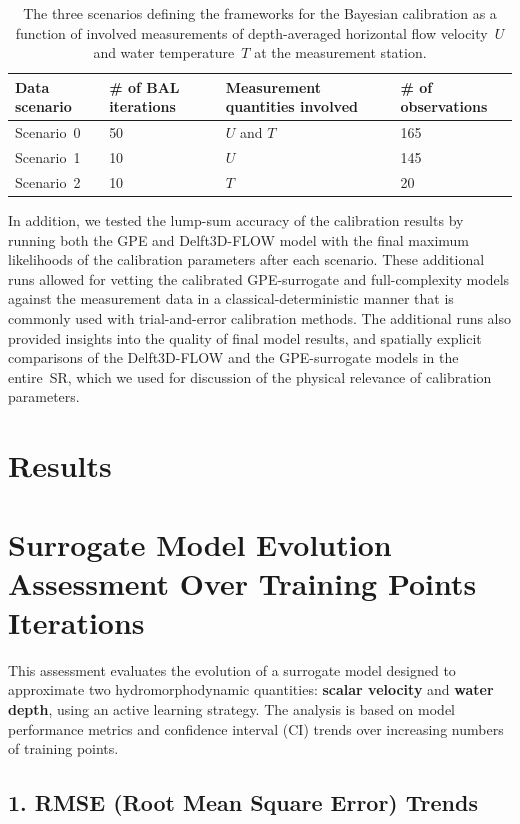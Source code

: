 \documentclass[draft,linenumbers,onecolumn]{agujournal2019} %
\begin{document}
\begin{table}
	\caption{The three scenarios defining the frameworks for the Bayesian calibration as a function of involved measurements of depth-averaged horizontal flow velocity~$U$ and water temperature~$T$ at the measurement station.}
	\label{tab:scenarios}
	\centering
	\begin{tabular}{P{2cm} P{4cm} P{3cm} P{2cm}} 
		\hline
		Data scenario & \# of BAL iterations & Measurement quantities involved & \# of observations \\
		\hline
		Scenario~0 & 50 & $U$ and $T$ & 165 \\ 
		Scenario~1 & 10 & $U$ & 145 \\ 
		Scenario~2 & 10 & $T$ & 20 \\ 
		\hline
	\end{tabular}
\end{table}

In addition, we tested the lump-sum accuracy of the calibration results by running both the GPE and Delft3D-FLOW model with the final maximum likelihoods of the calibration parameters after each scenario. These additional runs allowed for vetting the calibrated GPE-surrogate and full-complexity models against the measurement data in a classical-deterministic manner that is commonly used with trial-and-error calibration methods. The additional runs also provided insights into the quality of final model results, and spatially explicit comparisons of the Delft3D-FLOW and the GPE-surrogate models in the entire~SR, which we used for discussion of the physical relevance of calibration parameters.

\section{Results}

\section*{Surrogate Model Evolution Assessment Over Training Points Iterations}

This assessment evaluates the evolution of a surrogate model designed to approximate two hydromorphodynamic quantities: \textbf{scalar velocity} and \textbf{water depth}, using an active learning strategy. The analysis is based on model performance metrics and confidence interval (CI) trends over increasing numbers of training points.

\subsection*{1. RMSE (Root Mean Square Error) Trends}
\end{document}
